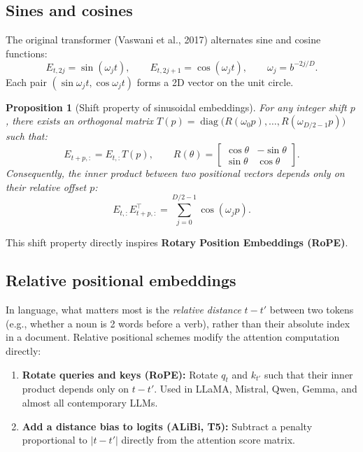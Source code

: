 \documentclass[11pt,a4paper]{article}
\newcommand{\slides}[1]{\par\nopagebreak\noindent{\normalfont\small\emph{(slides #1)}}\par\nopagebreak\vspace{2pt}}
\theoremstyle{definition}
\theoremstyle{plain}
\newtheorem{proposition}[definition]{Proposition}
\begin{document}
\subsection{Sines and cosines}\slides{50 / 84}
The original transformer (Vaswani et al., 2017) alternates sine and cosine functions:
\begin{equation}\label{eq:sin_cos}
E_{t, 2j} = \sin(\omega_j t), \qquad E_{t, 2j+1} = \cos(\omega_j t), \qquad \omega_j = b^{-2j/D}.
\end{equation}
Each pair $(\sin \omega_j t, \cos \omega_j t)$ forms a 2D vector on the unit circle.
\begin{proposition}[Shift property of sinusoidal embeddings]\label{prop:sin_shift}
For any integer shift $p$, there exists an orthogonal matrix $T(p) = \operatorname{diag}\big(R(\omega_0 p), \dots, R(\omega_{D/2-1} p)\big)$ such that:
\begin{equation}
E_{t+p,:} = E_{t,:} T(p), \qquad R(\theta) = \begin{bmatrix} \cos\theta & -\sin\theta \\ \sin\theta & \cos\theta \end{bmatrix}.
\end{equation}
Consequently, the inner product between two positional vectors depends only on their relative offset $p$:
\begin{equation}
E_{t,:} E_{t+p,:}^\top = \sum_{j=0}^{D/2-1} \cos(\omega_j p).
\end{equation}
\end{proposition}
This shift property directly inspires \textbf{Rotary Position Embeddings (RoPE)}.

\subsection{Relative positional embeddings}\slides{51 / 84}
In language, what matters most is the \emph{relative distance} $t - t'$ between two tokens (e.g., whether a noun is 2 words before a verb), rather than their absolute index in a document. Relative positional schemes modify the attention computation directly:
\begin{enumerate}
\item \textbf{Rotate queries and keys (RoPE):} Rotate $q_t$ and $k_{t'}$ such that their inner product depends only on $t - t'$. Used in LLaMA, Mistral, Qwen, Gemma, and almost all contemporary LLMs.
\item \textbf{Add a distance bias to logits (ALiBi, T5):} Subtract a penalty proportional to $|t - t'|$ directly from the attention score matrix.
\end{enumerate}
\end{document}
